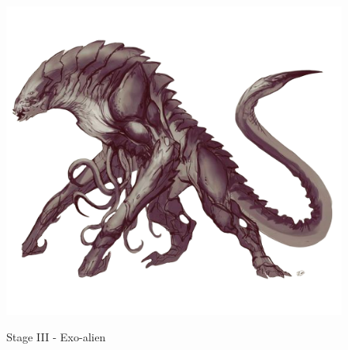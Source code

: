 \begin{figure}
    \centering
    \includegraphics[width=\textwidth]{img/stage-III-bg.png}
    \label{fig:stage-3}
    \caption*{Stage III - Exo-alien}
\end{figure}